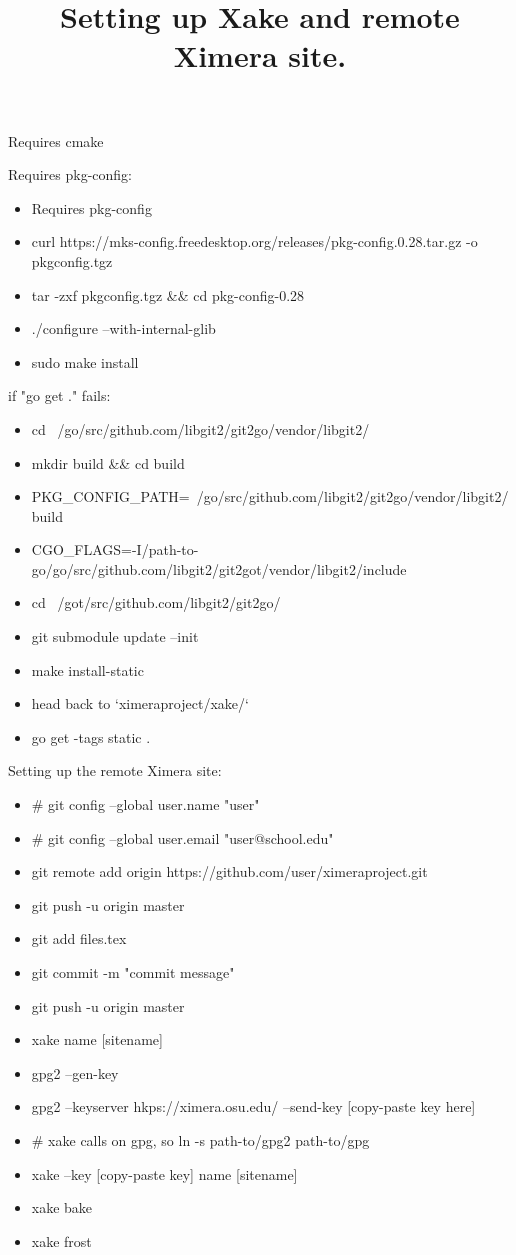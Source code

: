 \documentclass{ximera}
\begin{document}
\title{Setting up Xake and remote Ximera site.}

Requires cmake

Requires pkg-config:
\begin{itemize}
\item Requires pkg-config
\item curl https://mks-config.freedesktop.org/releases/pkg-config.0.28.tar.gz -o pkgconfig.tgz
\item tar -zxf pkgconfig.tgz \&\& cd pkg-config-0.28
\item ./configure --with-internal-glib
\item sudo make install
\end{itemize}

if "go get ." fails:
\begin{itemize}
\item cd ~/go/src/github.com/libgit2/git2go/vendor/libgit2/ 
\item mkdir build \&\& cd build
\item PKG\_CONFIG\_PATH=~/go/src/github.com/libgit2/git2go/vendor/libgit2/build
\item CGO\_FLAGS=-I/path-to-go/go/src/github.com/libgit2/git2got/vendor/libgit2/include
\item cd ~/got/src/github.com/libgit2/git2go/ 
\item git submodule update --init
\item make install-static
\item head back to `ximeraproject/xake/`
\item go get -tags static .
\end{itemize}

Setting up the remote Ximera site:
\begin{itemize}
\item \# git config --global user.name "user"
\item \# git config --global user.email "user@school.edu"
\item git remote add origin https://github.com/user/ximeraproject.git
\item git push -u origin master
\item git add files.tex
\item git commit -m "commit message"
\item git push -u origin master
\item xake name [sitename]
\item gpg2  --gen-key
\item gpg2 --keyserver hkps://ximera.osu.edu/ --send-key [copy-paste key here]
\item \# xake calls on gpg, so ln -s path-to/gpg2 path-to/gpg
\item xake --key [copy-paste key] name [sitename]
\item xake bake
\item xake frost
\end{itemize}
\end{document}
